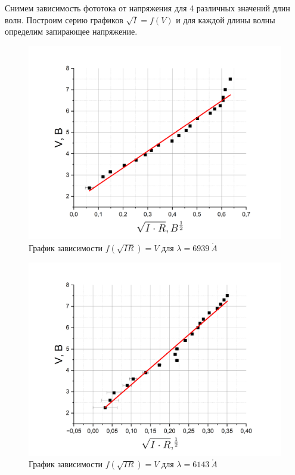\documentclass[a4paper,12pt]{article}
\begin{document}
Снимем зависимость фототока от напряжения для 4 различных значений длин волн. Построим серию графиков $\sqrt{I} = f(V)$ и для каждой длины волны определим запирающее напряжение.

\pagebreak

\begin{figure}[h!]
	\centering
	\includegraphics[width =0.8\linewidth]{lambda = 6939 A}
	\caption{График зависимости $f(\sqrt{IR}) = V$ для $\lambda = 6939 \ \mathring{A}$}
	\label{graph3:6939 A}
\end{figure}

\begin{figure}[h!]
	\centering
	\includegraphics[width = 0.8\linewidth]{lambda = 6143 A}
	\caption{График зависимости $f(\sqrt{IR}) = V$ для $\lambda = 6143 \ \mathring{A}$}
	\label{graph4:6143 A}
\end{figure}

\pagebreak
\end{document}
